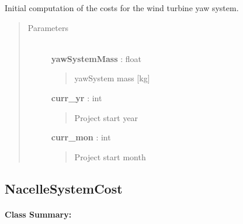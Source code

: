 \documentclass[letterpaper,10pt,openany,oneside]{sphinxmanual}
\begin{document}
\begin{fulllineitems}
\label{documentation:turbine_costSE.src.nacelle_costsSE.YawSystemCost}
Initial computation of the costs for the wind turbine yaw system.
\begin{quote}\begin{description}
\item[{Parameters }] \leavevmode\\
\textbf{yawSystemMass} : float
\begin{quote}

yawSystem mass {[}kg{]}
\end{quote}

\textbf{curr\_yr} : int
\begin{quote}

Project start year
\end{quote}

\textbf{curr\_mon} : int
\begin{quote}

Project start month
\end{quote}

\end{description}\end{quote}

\end{fulllineitems}



\subsection{NacelleSystemCost}
\label{documentation:nacellesystemcost}\label{documentation:nacellesystemcost-class-label}\paragraph{Class Summary:}
\end{document}
